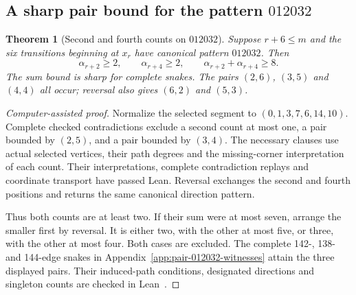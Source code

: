 \documentclass[11pt,a4paper]{article}
\newtheorem{theorem}{Theorem}[section]
\theoremstyle{definition}
\theoremstyle{remark}
\begin{document}
\subsection{A sharp pair bound for the pattern $012032$}\label{sec:pair-012032}
\begin{theorem}[Second and fourth counts on $012032$]\label{thm:pair-012032}
Suppose $r+6\le m$ and the six transitions beginning at $x_r$ have canonical
pattern $012032$. Then
\[
\alpha_{r+2}\ge2,\qquad \alpha_{r+4}\ge2,\qquad
\alpha_{r+2}+\alpha_{r+4}\ge8.
\]
The sum bound is sharp for complete snakes. The pairs $(2,6)$, $(3,5)$ and
$(4,4)$ all occur; reversal also gives $(6,2)$ and $(5,3)$.
\end{theorem}
\begin{proof}[Computer-assisted proof]
Normalize the selected segment to $(0,1,3,7,6,14,10)$. Complete checked
contradictions exclude a second count at most one, a pair bounded by $(2,5)$,
and a pair bounded by $(3,4)$. The necessary clauses use actual selected
vertices, their path degrees and the missing-corner interpretation of each
count. Their interpretations, complete contradiction replays and coordinate
transport have passed Lean. Reversal exchanges the second and fourth
positions and returns the same canonical direction pattern.

Thus both counts are at least two. If their sum were at most seven, arrange
the smaller first by reversal. It is either two, with the other at most five,
or three, with the other at most four. Both cases are excluded. The complete
142-, 138- and 144-edge snakes in Appendix~\ref{app:pair-012032-witnesses}
attain the three displayed pairs. Their induced-path conditions, designated
directions and singleton counts are checked in Lean~\cite{pair012032archive}.
\end{proof}
\end{document}
